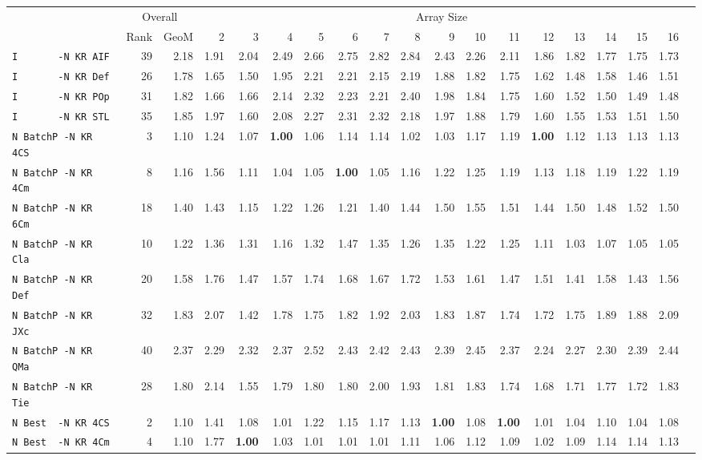 \begin{tabular}{l | r @{~~} r | r@{~~}r@{~~}r@{~~}r@{~~}r@{~~}r@{~~}r@{~~}r@{~~}r@{~~}r@{~~}r@{~~}r@{~~}r@{~~}r@{~~}r@{~~}r|}
 & \multicolumn{2}{c}{Overall} & \multicolumn{15}{c}{Array Size} \\
 & Rank & GeoM & 2&3&4&5&6&7&8&9&10&11&12&13&14&15&16\\ \hline
\verb+I       -N KR AIF+ & 39 & 2.18 & 1.91&2.04&2.49&2.66&2.75&2.82&2.84&2.43&2.26&2.11&1.86&1.82&1.77&1.75&1.73\\
\verb+I       -N KR Def+ & 26 & 1.78 & 1.65&1.50&1.95&2.21&2.21&2.15&2.19&1.88&1.82&1.75&1.62&1.48&1.58&1.46&1.51\\
\verb+I       -N KR POp+ & 31 & 1.82 & 1.66&1.66&2.14&2.32&2.23&2.21&2.40&1.98&1.84&1.75&1.60&1.52&1.50&1.49&1.48\\
\verb+I       -N KR STL+ & 35 & 1.85 & 1.97&1.60&2.08&2.27&2.31&2.32&2.18&1.97&1.88&1.79&1.60&1.55&1.53&1.51&1.50\\
\verb+N BatchP -N KR 4CS+ & 3 & 1.10 & 1.24&1.07&\textbf{1.00}&1.06&1.14&1.14&1.02&1.03&1.17&1.19&\textbf{1.00}&1.12&1.13&1.13&1.13\\
\verb+N BatchP -N KR 4Cm+ & 8 & 1.16 & 1.56&1.11&1.04&1.05&\textbf{1.00}&1.05&1.16&1.22&1.25&1.19&1.13&1.18&1.19&1.22&1.19\\
\verb+N BatchP -N KR 6Cm+ & 18 & 1.40 & 1.43&1.15&1.22&1.26&1.21&1.40&1.44&1.50&1.55&1.51&1.44&1.50&1.48&1.52&1.50\\
\verb+N BatchP -N KR Cla+ & 10 & 1.22 & 1.36&1.31&1.16&1.32&1.47&1.35&1.26&1.35&1.22&1.25&1.11&1.03&1.07&1.05&1.05\\
\verb+N BatchP -N KR Def+ & 20 & 1.58 & 1.76&1.47&1.57&1.74&1.68&1.67&1.72&1.53&1.61&1.47&1.51&1.41&1.58&1.43&1.56\\
\verb+N BatchP -N KR JXc+ & 32 & 1.83 & 2.07&1.42&1.78&1.75&1.82&1.92&2.03&1.83&1.87&1.74&1.72&1.75&1.89&1.88&2.09\\
\verb+N BatchP -N KR QMa+ & 40 & 2.37 & 2.29&2.32&2.37&2.52&2.43&2.42&2.43&2.39&2.45&2.37&2.24&2.27&2.30&2.39&2.44\\
\verb+N BatchP -N KR Tie+ & 28 & 1.80 & 2.14&1.55&1.79&1.80&1.80&2.00&1.93&1.81&1.83&1.74&1.68&1.71&1.77&1.72&1.83\\
\verb+N Best  -N KR 4CS+ & 2 & 1.10 & 1.41&1.08&1.01&1.22&1.15&1.17&1.13&\textbf{1.00}&1.08&\textbf{1.00}&1.01&1.04&1.10&1.04&1.08\\
\verb+N Best  -N KR 4Cm+ & 4 & 1.10 & 1.77&\textbf{1.00}&1.03&1.01&1.01&1.01&1.11&1.06&1.12&1.09&1.02&1.09&1.14&1.14&1.13\\

\end{tabular}
